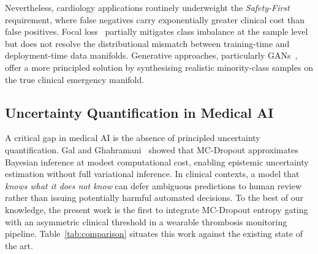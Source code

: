 \documentclass[conference]{IEEEtran}
\begin{document}
Nevertheless, cardiology applications routinely underweight the
\textit{Safety-First} requirement, where false negatives carry
exponentially greater clinical cost than false positives.  Focal
loss~\cite{b4} partially mitigates class imbalance at the sample level
but does not resolve the distributional mismatch between training-time
and deployment-time data manifolds.  Generative approaches,
particularly GANs~\cite{b23}, offer a more principled solution by
synthesising realistic minority-class samples on the true clinical
emergency manifold.

\subsection{Uncertainty Quantification in Medical AI}
A critical gap in medical AI is the absence of principled uncertainty
quantification.  Gal and Ghahramani~\cite{b3} showed that MC-Dropout
approximates Bayesian inference at modest computational cost, enabling
epistemic uncertainty estimation without full variational inference.
In clinical contexts, a model that \textit{knows what it does not know}
can defer ambiguous predictions to human review rather than issuing
potentially harmful automated decisions.  To the best of our knowledge,
the present work is the first to integrate MC-Dropout entropy gating
with an asymmetric clinical threshold in a wearable thrombosis
monitoring pipeline.  Table~\ref{tab:comparison} situates this work
against the existing state of the art.

\begin{table}[h]
\caption{Comparison of AI Clot Detection Methodologies}
\label{tab:comparison}
\centering
{}
\end{table}
\end{document}
